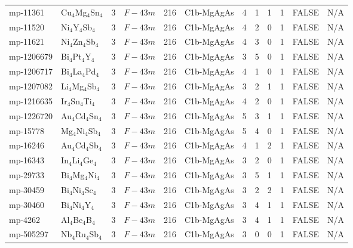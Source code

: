 {\begin{longtable}{llcccccccccc}
    mp-11361 & Cu$_{4}$Mg$_{4}$Sn$_{4}$ & 3     & $F-43m$ & 216   & C1b-MgAgAs & 4     & 1     & 1     & 1     & FALSE & N/A \\
    mp-11520 & Ni$_{4}$Y$_{4}$Sb$_{4}$ & 3     & $F-43m$ & 216   & C1b-MgAgAs & 4     & 2     & 0     & 1     & FALSE & N/A \\
    mp-11621 & Ni$_{4}$Zn$_{4}$Sb$_{4}$ & 3     & $F-43m$ & 216   & C1b-MgAgAs & 4     & 3     & 0     & 1     & FALSE & N/A \\
    mp-1206679 & Bi$_{4}$Pt$_{4}$Y$_{4}$ & 3     & $F-43m$ & 216   & C1b-MgAgAs & 3     & 5     & 0     & 1     & FALSE & N/A \\
    mp-1206717 & Bi$_{4}$La$_{4}$Pd$_{4}$ & 3     & $F-43m$ & 216   & C1b-MgAgAs & 4     & 1     & 0     & 1     & FALSE & N/A \\
    mp-1207082 & Li$_{4}$Mg$_{4}$Sb$_{4}$ & 3     & $F-43m$ & 216   & C1b-MgAgAs & 3     & 2     & 1     & 1     & FALSE & N/A \\
    mp-1216635 & Ir$_{4}$Sn$_{4}$Ti$_{4}$ & 3     & $F-43m$ & 216   & C1b-MgAgAs & 4     & 2     & 0     & 1     & FALSE & N/A \\
    mp-1226720 & Au$_{4}$Cd$_{4}$Sn$_{4}$ & 3     & $F-43m$ & 216   & C1b-MgAgAs & 5     & 3     & 1     & 1     & FALSE & N/A \\
    mp-15778 & Mg$_{4}$Ni$_{4}$Sb$_{4}$ & 3     & $F-43m$ & 216   & C1b-MgAgAs & 5     & 4     & 0     & 1     & FALSE & N/A \\
    mp-16246 & Au$_{4}$Cd$_{4}$Sb$_{4}$ & 3     & $F-43m$ & 216   & C1b-MgAgAs & 4     & 1     & 2     & 1     & FALSE & N/A \\
    mp-16343 & In$_{4}$Li$_{4}$Ge$_{4}$ & 3     & $F-43m$ & 216   & C1b-MgAgAs & 3     & 2     & 0     & 1     & FALSE & N/A \\
    mp-29733 & Bi$_{4}$Mg$_{4}$Ni$_{4}$ & 3     & $F-43m$ & 216   & C1b-MgAgAs & 3     & 5     & 1     & 1     & FALSE & N/A \\
    mp-30459 & Bi$_{4}$Ni$_{4}$Sc$_{4}$ & 3     & $F-43m$ & 216   & C1b-MgAgAs & 3     & 2     & 2     & 1     & FALSE & N/A \\
    mp-30460 & Bi$_{4}$Ni$_{4}$Y$_{4}$ & 3     & $F-43m$ & 216   & C1b-MgAgAs & 3     & 4     & 1     & 1     & FALSE & N/A \\
    mp-4262 & Al$_{4}$Be$_{4}$B$_{4}$ & 3     & $F-43m$ & 216   & C1b-MgAgAs & 3     & 4     & 1     & 1     & FALSE & N/A \\
    mp-505297 & Nb$_{4}$Ru$_{4}$Sb$_{4}$ & 3     & $F-43m$ & 216   & C1b-MgAgAs & 3     & 0     & 0     & 1     & FALSE & N/A \\

\end{longtable}}

